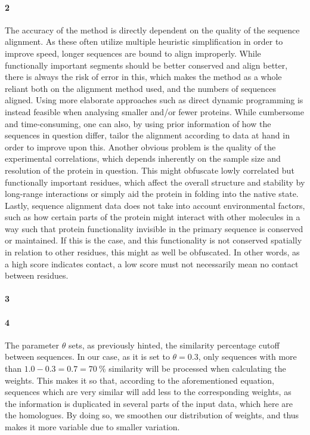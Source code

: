 \documentclass[11pt]{article}\usepackage[]{graphicx}\usepackage[]{color}
\theoremstyle{plain}
\begin{document}
\begin{multicols*}{2}
\paragraph{2}
The accuracy of the method is directly dependent on the quality of the sequence alignment. As these often utilize multiple heuristic simplification in order to improve speed, longer sequences are bound to align improperly. While functionally important segments should be better conserved and align better, there is always the risk of error in this, which makes the method as a whole reliant both on the alignment method used, and the numbers of sequences aligned. Using more elaborate approaches such as direct dynamic programming is instead feasible when analysing smaller and/or fewer proteins. While cumbersome and time-consuming, one can also, by using prior information of how the sequences in question differ, tailor the alignment according to data at hand in order to improve upon this. Another obvious problem is the quality of the experimental correlations, which depends inherently on the sample size and resolution of the protein in question. This might obfuscate lowly correlated but functionally important residues, which affect the overall structure and stability by long-range interactions or simply aid the protein in folding into the native state. Lastly, sequence alignment data does not take into account environmental factors, such as how certain parts of the protein might interact with other molecules in a way such that protein functionality invisible in the primary sequence is conserved or maintained. If this is the case, and this functionality is not conserved spatially in relation to other residues, this might as well be obfuscated. In other words, as a high score indicates contact, a low score must not necessarily mean no contact between residues.


\paragraph{3}

\paragraph{4}
The parameter $\theta$ sets, as previously hinted, the similarity percentage cutoff between sequences. In our case, as it is set to $\theta = 0.3$, only sequences with more than $1.0 - 0.3 = 0.7 = 70~\%$ similarity will be processed when calculating the weights. This makes it so that, according to the aforementioned equation, sequences which are very similar will add less to the corresponding weights, as the information is duplicated in several parts of the input data, which here are the homologues. By doing so, we smoothen our distribution of weights, and thus makes it more variable due to smaller variation.


\end{multicols*}
\end{document}
